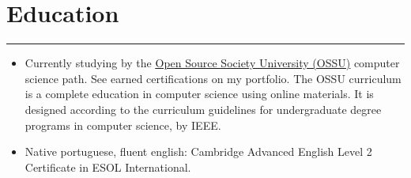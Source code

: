 \documentclass[a4paper,10pt]{article}
\newcommand{\ulink}[2]{\href{#1}{\underline{#2}}}
\begin{document}
\section*{Education}
\hrule
\vspace{2mm}
\begin{itemize}[itemsep=0pt]
  \item Currently studying by the
        \ulink{https://github.com/ossu/computer-science}{Open Source Society University (OSSU)}
        computer science path. See earned certifications on my portfolio. The OSSU curriculum
        is a complete education in computer science using online materials. It is designed
        according to the curriculum guidelines for undergraduate degree programs in computer science, by IEEE.
  \item Native portuguese, fluent english: Cambridge Advanced English Level 2 Certificate in ESOL International.
\end{itemize}
\end{document}
